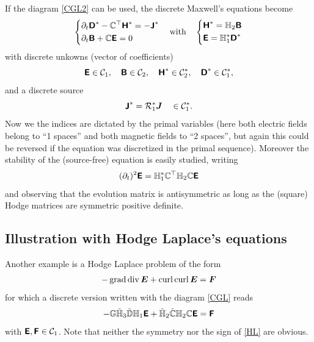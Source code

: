 \documentclass[11pt]{article}
\begin{document}
If the diagram \eqref{CGL2} can be used, the discrete Maxwell's equations become
\begin{equation} \label{max2}
	\left\{\begin{aligned}
		&\partial_t {\boldsymbol {\rm \mathsf{D}}}^* - \mathbb{C}^\top {\boldsymbol{\rm \mathsf{H}}}^* = - {\boldsymbol {\rm \mathsf{J}}}^*
		\\
		&\partial_t {\boldsymbol {\rm \mathsf{B}}} + \mathbb{C} {\boldsymbol {\rm \mathsf{E}}} = 0
	\end{aligned}\right.
	\quad \text{with} \quad
	\left\{\begin{aligned}
		&{\boldsymbol {\rm \mathsf{H}}}^* = \mathbb{H}_2 {\boldsymbol {\rm \mathsf{B}}}
		\\
		&{\boldsymbol {\rm \mathsf{E}}} = \mathbb{H}^*_1 {\boldsymbol {\rm \mathsf{D}}}^*
	\end{aligned}\right.
\end{equation}
with discrete unkowns (vector of coefficients) 
$$
{\boldsymbol {\rm \mathsf{E}}} \in \mathcal{C}_1, 
\quad
{\boldsymbol{\rm \mathsf{B}}} \in \mathcal{C}_2, 
\quad
{\boldsymbol{\rm \mathsf{H}}}^* \in \mathcal{C}_2^*, 
\quad
{\boldsymbol{\rm \mathsf{D}}}^* \in \mathcal{C}_1^*,
$$
and a discrete source 
\begin{equation} \label{arrJ2}
	{\boldsymbol{\rm \mathsf{J}}}^* = \mathcal{R}_1^* {\boldsymbol J} \quad \in \mathcal{C}_1^*.
\end{equation}
Now we the indices are dictated by the primal variables (here both 
electric fields belong to ``1 spaces'' and both magnetic fields 
to ``2 spaces'', but again this could be reversed if the \Ampere{} equation
was discretized in the primal sequence).
Moreover the stability of the (source-free) equation is easily studied,
writing
$$
(\partial_t)^2 {\boldsymbol {\rm \mathsf{E}}} = \mathbb{H}^*_1 \mathbb{C}^\top \mathbb{H}_2 \mathbb{C} {\boldsymbol {\rm \mathsf{E}}} 
$$
and observing that the evolution matrix is antisymmetric as long as the (square) Hodge matrices are symmetric positive definite.

\subsection{Illustration with Hodge Laplace's equations}

Another example is a Hodge Laplace problem of the form
\begin{equation} \label{HL_cont}
		-\operatorname{grad} \operatorname{div} {\boldsymbol E} + \operatorname{curl} \operatorname{curl} {{\boldsymbol E}} = {\boldsymbol F}
\end{equation}
for which a discrete version written with the diagram \eqref{CGL} reads
\begin{equation} \label{HL}
	-\mathbb{G} \tilde{\mathbb{H}}_3 \tilde{\mathbb{D}} \mathbb{H}_1 {\boldsymbol {\rm \mathsf{E}}} + \tilde{\mathbb{H}}_2 \tilde{\mathbb{C}} \mathbb{H}_2 \mathbb{C} {\boldsymbol {\rm \mathsf{E}}} 
		= {\boldsymbol {\rm \mathsf{F}}}
\end{equation}
with ${\boldsymbol {\rm \mathsf{E}}}, {\boldsymbol {\rm \mathsf{F}}} \in \mathcal{C}_1$.
Note that neither the symmetry nor the sign of \eqref{HL} are obvious.
\end{document}
